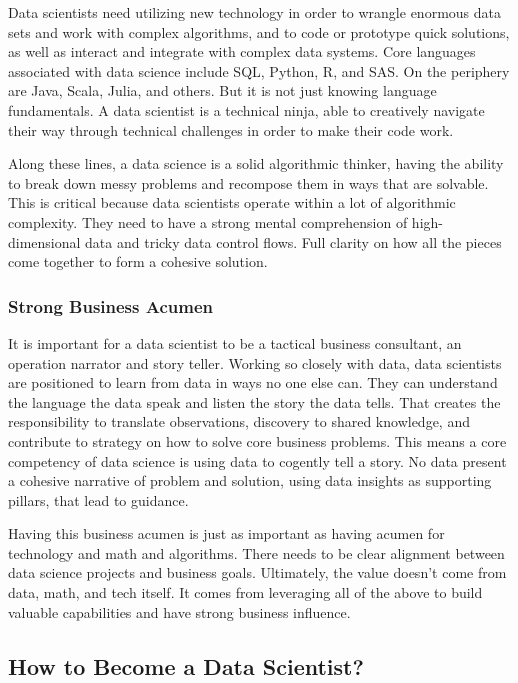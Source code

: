 \documentclass[
]{book}
\begin{document}
Data scientists need utilizing new technology in order to wrangle enormous data sets and work with complex algorithms, and to code or prototype quick solutions, as well as interact and integrate with complex data systems. Core languages associated with data science include SQL, Python, R, and SAS. On the periphery are Java, Scala, Julia, and others. But it is not just knowing language fundamentals. A data scientist is a technical ninja, able to creatively navigate their way through technical challenges in order to make their code work.

Along these lines, a data science is a solid algorithmic thinker, having the ability to break down messy problems and recompose them in ways that are solvable. This is critical because data scientists operate within a lot of algorithmic complexity. They need to have a strong mental comprehension of high-dimensional data and tricky data control flows. Full clarity on how all the pieces come together to form a cohesive solution.

\hypertarget{strong-business-acumen}{%
\subsubsection{Strong Business Acumen}\label{strong-business-acumen}}

It is important for a data scientist to be a tactical business consultant, an operation narrator and story teller. Working so closely with data, data scientists are positioned to learn from data in ways no one else can. They can understand the language the data speak and listen the story the data tells. That creates the responsibility to translate observations, discovery to shared knowledge, and contribute to strategy on how to solve core business problems. This means a core competency of data science is using data to cogently tell a story. No data present a cohesive narrative of problem and solution, using data insights as supporting pillars, that lead to guidance.

Having this business acumen is just as important as having acumen for technology and math and algorithms. There needs to be clear alignment between data science projects and business goals. Ultimately, the value doesn't come from data, math, and tech itself. It comes from leveraging all of the above to build valuable capabilities and have strong business influence.

\hypertarget{how-to-become-a-data-scientist}{%
\subsection{How to Become a Data Scientist?}\label{how-to-become-a-data-scientist}}
\end{document}

